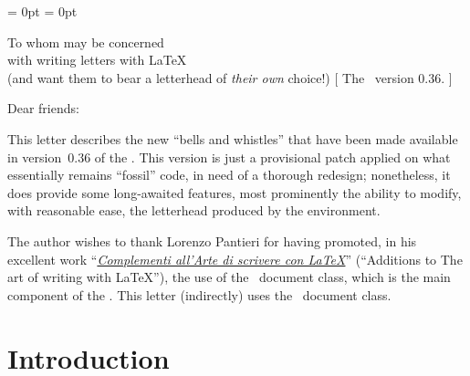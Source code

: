 \newcommand*\cleantop{%
	\dimen@ \baselineskip
	\advance \dimen@ -\topskip
	\prevdepth \dimen@
}
\newcommand*\cleanbot{%
	\dimen@ \baselineskip
	\advance \dimen@ -\topskip
	\advance \dimen@ -\prevdepth
	\vskip \dimen@
	\prevdepth \z@
}
\newcommand*\cleanbotp{%
	\vskip -\prevdepth
	\prevdepth \z@
}

\makeatother

\hfuzz = 0pt
\vfuzz = 0pt










\begin{letterhead}{
	To whom may be concerned\\
	with writing letters with \LaTeX\\
	(and want them to bear a letterhead
	of \emph{their own} choice!)
}[
	The \Bundle\ version 0.36.
]

\opening{Dear friends:}

This letter describes the new ``bells and whistles'' that have been made
available in version~0.36 of the \Bundle.  This version is just a provisional
patch applied on what essentially remains ``fossil'' code, in need of a thorough
redesign; nonetheless, it does provide some long-awaited features, most
prominently the ability to modify, with reasonable ease, the letterhead produced
by the  environment.

The author wishes to thank Lorenzo Pantieri for having promoted, in his
excellent work
``\href{http://www.lorenzopantieri.net/LaTeX_files/Complementi.pdf}
{\emph{Complementi all'Arte di scrivere con \LaTeX}}'' (``Additions to The art
of writing with \LaTeX''), the use of the \lcdp\ document class, which is the
main component of the \Bundle.  This letter (indirectly) uses the \acdp\
document class.



\tableofcontents
\listoflistings



\setcounter{secnumdepth}{0}

\section{Introduction}


\end{letterhead}

